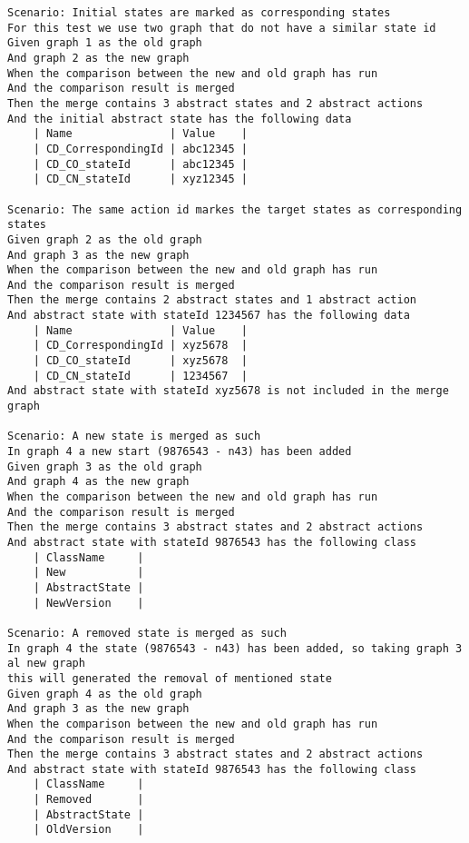 \begin{lstlisting}[language=Gherkin, caption=Test Scenario's, label=code:gherkin-tests]
Scenario: Initial states are marked as corresponding states
For this test we use two graph that do not have a similar state id 
Given graph 1 as the old graph
And graph 2 as the new graph
When the comparison between the new and old graph has run
And the comparison result is merged
Then the merge contains 3 abstract states and 2 abstract actions
And the initial abstract state has the following data
    | Name               | Value    |
    | CD_CorrespondingId | abc12345 |
    | CD_CO_stateId      | abc12345 |
    | CD_CN_stateId      | xyz12345 |

Scenario: The same action id markes the target states as corresponding states
Given graph 2 as the old graph
And graph 3 as the new graph
When the comparison between the new and old graph has run
And the comparison result is merged
Then the merge contains 2 abstract states and 1 abstract action
And abstract state with stateId 1234567 has the following data
    | Name               | Value    |
    | CD_CorrespondingId | xyz5678  |
    | CD_CO_stateId      | xyz5678  |
    | CD_CN_stateId      | 1234567  |
And abstract state with stateId xyz5678 is not included in the merge graph

Scenario: A new state is merged as such
In graph 4 a new start (9876543 - n43) has been added
Given graph 3 as the old graph
And graph 4 as the new graph
When the comparison between the new and old graph has run
And the comparison result is merged
Then the merge contains 3 abstract states and 2 abstract actions
And abstract state with stateId 9876543 has the following class
    | ClassName     |
    | New           |
    | AbstractState |
    | NewVersion    |

Scenario: A removed state is merged as such
In graph 4 the state (9876543 - n43) has been added, so taking graph 3 al new graph
this will generated the removal of mentioned state
Given graph 4 as the old graph
And graph 3 as the new graph
When the comparison between the new and old graph has run
And the comparison result is merged
Then the merge contains 3 abstract states and 2 abstract actions
And abstract state with stateId 9876543 has the following class
    | ClassName     |
    | Removed       |
    | AbstractState |
    | OldVersion    |


\end{lstlisting}
